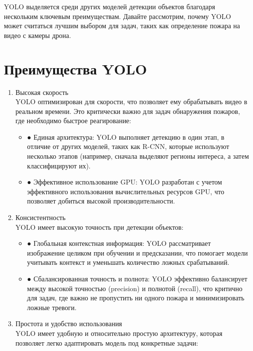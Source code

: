     YOLO выделяется среди других моделей детекции объектов благодаря нескольким ключевым преимуществам. Давайте рассмотрим, почему YOLO может считаться лучшим выбором для задач, таких как определение пожара на видео с камеры дрона.

    \section{Преимущества YOLO}
    \begin{enumerate}
        \item Высокая скорость \\
        YOLO оптимизирован для скорости, что позволяет ему обрабатывать видео в реальном времени. Это критически важно для задач обнаружения пожаров, где необходимо быстрое реагирование:
            \begin{itemize}
                \item ●	Единая архитектура: YOLO выполняет детекцию в один этап, в отличие от других моделей, таких как R-CNN, которые используют несколько этапов (например, сначала выделяют регионы интереса, а затем классифицируют их).
                \item ●	Эффективное использование GPU: YOLO разработан с учетом эффективного использования вычислительных ресурсов GPU, что позволяет добиться высокой производительности.
            \end{itemize}
        \item Консистентность \\
        YOLO имеет высокую точность при детекции объектов:
            \begin{itemize}
                \item ●	Глобальная контекстная информация: YOLO рассматривает изображение целиком при обучении и предсказании, что помогает модели учитывать контекст и уменьшать количество ложных срабатываний.
                \item ●	Сбалансированная точность и полнота: YOLO эффективно балансирует между высокой точностью (precision) и полнотой (recall), что критично для задач, где важно не пропустить ни одного пожара и минимизировать ложные тревоги.
            \end{itemize}
        \item Простота и удобство использования \\
        YOLO имеет удобную и относительно простую архитектуру, которая позволяет легко адаптировать модель под конкретные задачи:
            \begin{itemize}

\end{itemize}
\end{enumerate}
